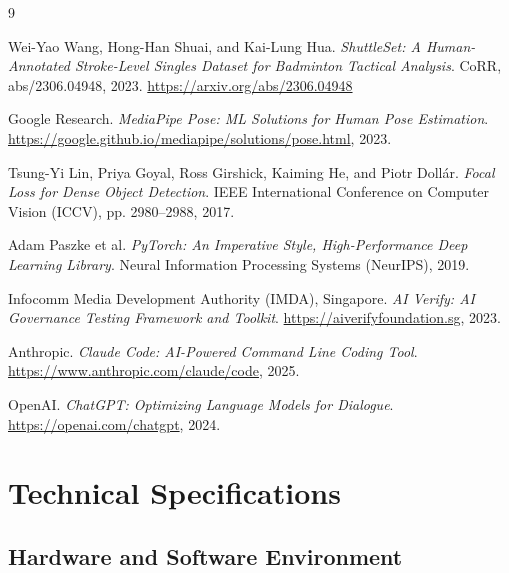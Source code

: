 \documentclass[11pt,a4paper]{article}
\begin{document}
\begin{thebibliography}{9}

Wei-Yao Wang, Hong-Han Shuai, and Kai-Lung Hua.
\textit{ShuttleSet: A Human-Annotated Stroke-Level Singles Dataset for Badminton Tactical Analysis}.
CoRR, abs/2306.04948, 2023.
\url{https://arxiv.org/abs/2306.04948}

Google Research.
\textit{MediaPipe Pose: ML Solutions for Human Pose Estimation}.
\url{https://google.github.io/mediapipe/solutions/pose.html}, 2023.

Tsung-Yi Lin, Priya Goyal, Ross Girshick, Kaiming He, and Piotr Dollár.
\textit{Focal Loss for Dense Object Detection}.
IEEE International Conference on Computer Vision (ICCV), pp. 2980--2988, 2017.

Adam Paszke et al.
\textit{PyTorch: An Imperative Style, High-Performance Deep Learning Library}.
Neural Information Processing Systems (NeurIPS), 2019.

Infocomm Media Development Authority (IMDA), Singapore.
\textit{AI Verify: AI Governance Testing Framework and Toolkit}.
\url{https://aiverifyfoundation.sg}, 2023.

Anthropic.
\textit{Claude Code: AI-Powered Command Line Coding Tool}.
\url{https://www.anthropic.com/claude/code}, 2025.

OpenAI.
\textit{ChatGPT: Optimizing Language Models for Dialogue}.
\url{https://openai.com/chatgpt}, 2024.

\end{thebibliography}

\newpage
\appendix

\section{Technical Specifications}

\subsection{Hardware and Software Environment}
\end{document}

